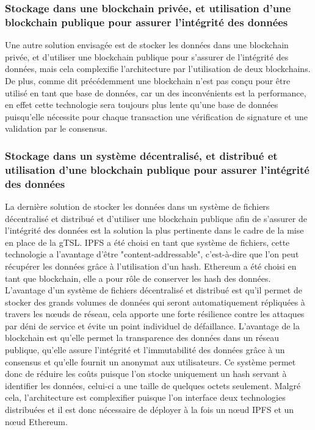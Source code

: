 \documentclass{tnreport}
\begin{document}
\subsubsection{Stockage dans une blockchain privée, et utilisation d'une blockchain publique pour assurer l'intégrité des données}

Une autre solution envisagée est de stocker les données dans une blockchain privée, et d'utiliser une blockchain publique pour s'assurer de l'intégrité des données, mais cela complexifie l'architecture par l'utilisation de deux blockchains. De plus, comme dit précédemment une blockchain n'est pas conçu pour être utilisé en tant que base de données, car un des inconvénients est la performance, en effet cette technologie sera toujours plus lente qu'une base de données puisqu'elle nécessite pour chaque transaction une vérification de signature et une validation par le consensus. 

\subsubsection{Stockage dans un système décentralisé, et distribué et utilisation d'une blockchain publique pour assurer l'intégrité des données}

La dernière solution de stocker les données dans un système de fichiers décentralisé et distribué et d'utiliser une blockchain publique afin de s'assurer de l'intégrité des données est la solution la plus pertinente dans le cadre de la mise en place de la gTSL. 
IPFS a été choisi en tant que système de fichiers, cette technologie a l'avantage d'être "content-addressable", c'est-à-dire que l'on peut récupérer les données grâce à l'utilisation d'un hash.
Ethereum a été choisi en tant que blockchain, elle a pour rôle de conserver les hash des données.
L'avantage d'un système de fichiers décentralisé et distribué est qu'il permet de stocker des grands volumes de données qui seront automatiquement répliquées à travers les nœuds de réseau, cela apporte une forte résilience contre les attaques par déni de service et évite un point individuel de défaillance.
L'avantage de la blockchain est qu'elle permet la transparence des données dans un réseau publique, qu'elle assure l'intégrité et l'immutabilité des données grâce à un consensus et qu'elle fournit un anonymat aux utilisateurs.
Ce système permet donc de réduire les coûts puisque l'on stocke uniquement un hash servant à identifier les données, celui-ci a une taille de quelques octets seulement.
Malgré cela, l'architecture est complexifier puisque l'on interface deux technologies distribuées et il est donc nécessaire de déployer à la fois un nœud IPFS et un nœud Ethereum.
\end{document}
